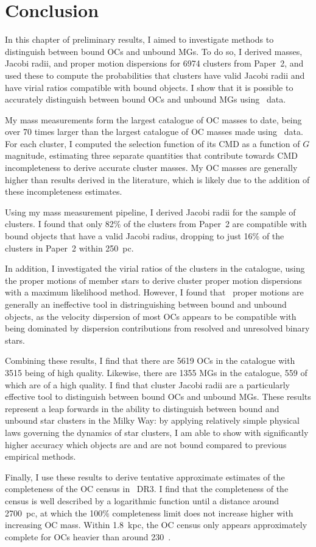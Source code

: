 \section{Conclusion}
\label{sec:dynamics:conclusion}

In this chapter of preliminary results, I aimed to investigate methods to distinguish between bound OCs and unbound MGs. To do so, I derived masses, Jacobi radii, and proper motion dispersions for 6974 clusters from Paper~2, and used these to compute the probabilities that clusters have valid Jacobi radii and have virial ratios compatible with bound objects. I show that it is possible to accurately distinguish between bound OCs and unbound MGs using \gaia\ data.

My mass measurements form the largest catalogue of OC masses to date, being over 70 times larger than the largest catalogue of OC masses made using \gaia\ data. For each cluster, I computed the selection function of its CMD as a function of $G$ magnitude, estimating three separate quantities that contribute towards CMD incompleteness to derive accurate cluster masses. My OC masses are generally higher than results derived in the literature, which is likely due to the addition of these incompleteness estimates. 

Using my mass measurement pipeline, I derived Jacobi radii for the sample of clusters. I found that only 82\% of the clusters from Paper~2 are compatible with bound objects that have a valid Jacobi radius, dropping to just 16\% of the clusters in Paper~2 within 250~pc.

In addition, I investigated the virial ratios of the clusters in the catalogue, using the proper motions of member stars to derive cluster proper motion dispersions with a maximum likelihood method. However, I found that \gaia\ proper motions are generally an ineffective tool in distringuishing between bound and unbound objects, as the velocity dispersion of most OCs appears to be compatible with being dominated by dispersion contributions from resolved and unresolved binary stars.

Combining these results, I find that there are 5619 OCs in the catalogue with 3515 being of high quality. Likewise, there are 1355 MGs in the catalogue, 559 of which are of a high quality. I find that cluster Jacobi radii are a particularly effective tool to distinguish between bound OCs and unbound MGs. These results represent a leap forwards in the ability to distinguish between bound and unbound star clusters in the Milky Way: by applying relatively simple physical laws governing the dynamics of star clusters, I am able to show with significantly higher accuracy which objects are and are not bound compared to previous empirical methods.

Finally, I use these results to derive tentative approximate estimates of the completeness of the OC census in \gaia\ DR3. I find that the completeness of the census is well described by a logarithmic function until a distance around 2700~pc, at which the 100\% completeness limit does not increase higher with increasing OC mass. Within 1.8~kpc, the OC census only appears approximately complete for OCs heavier than around 230~\MSun.
